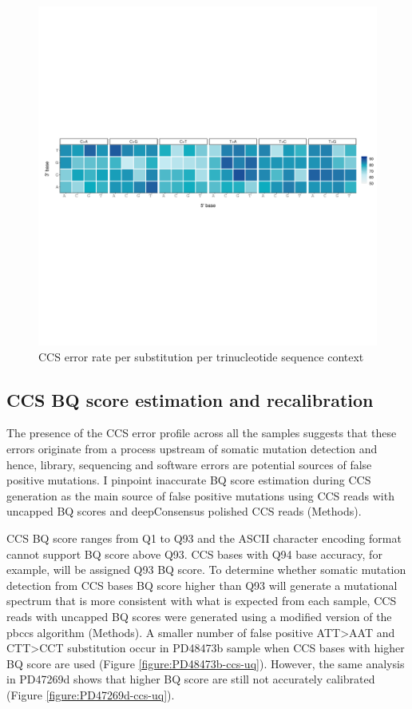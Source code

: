 \begin{figure}[htbp!]
\caption{CCS error rate per substitution per trinucleotide sequence context}
\label{figure:ccs-error-rate-per-substiution-per-trinucleotide-sequence-context}
\includegraphics[width=\textwidth]{Vector/ccs_error_rate.pdf}
\end{figure}


\subsection{CCS BQ score estimation and recalibration} 
\label{sec:CCS-base-quality-score-recalibration}

The presence of the CCS error profile across all the samples suggests that these errors originate from a process upstream of somatic mutation detection and hence, library, sequencing and software errors are potential sources of false positive mutations. I pinpoint inaccurate BQ score estimation during CCS generation as the main source of false positive mutations using CCS reads with uncapped BQ scores and deepConsensus polished CCS reads (Methods). 

CCS BQ score ranges from Q1 to Q93 and the ASCII character encoding format cannot support BQ score above Q93. CCS bases with Q94 base accuracy, for example, will be assigned Q93 BQ score. To determine whether somatic mutation detection from CCS bases BQ score higher than Q93 will generate a mutational spectrum that is more consistent with what is expected from each sample, CCS reads with uncapped BQ scores were generated using a modified version of the pbccs algorithm (Methods). A smaller number of false positive ATT>AAT and CTT>CCT substitution occur in PD48473b sample when CCS bases with higher BQ score are used (Figure \ref{figure:PD48473b-ccs-uq}). However, the same analysis in PD47269d shows that higher BQ score are still not accurately calibrated (Figure \ref{figure:PD47269d-ccs-uq}).

